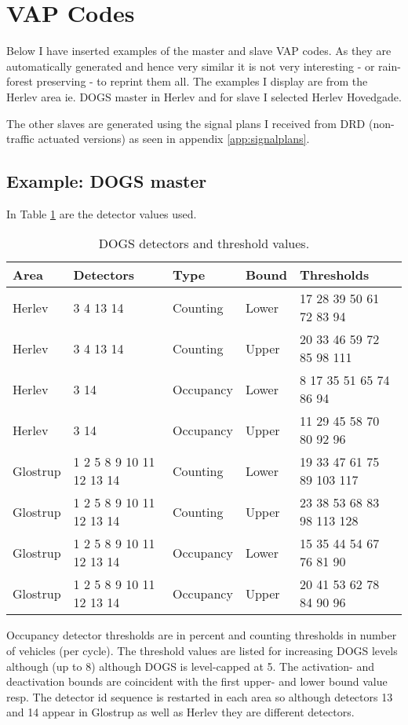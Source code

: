 \section{VAP Codes}
\label{app:vap}

Below I have inserted examples of the master and slave VAP codes. As they are automatically generated and hence very similar it is not very interesting - or rain-forest preserving - to reprint them all. The examples I display are from the Herlev area ie. DOGS master in Herlev and for slave I selected Herlev Hovedgade.

The other slaves are generated using the signal plans I received from DRD (non-traffic actuated versions) as seen in appendix \ref{app:signalplans}. 

\subsection{Example: DOGS master}
In Table \ref{tab:thvals} are the detector values used.

\begin{table}[ht]
\centering
\begin{tabular}{l|l|l|l|l}
\textbf{Area} & \textbf{Detectors} & \textbf{Type} & \textbf{Bound} & \textbf{Thresholds}\\ \hline
Herlev & 3 4 13 14 & Counting & Lower & 17 28 39 50 61 72 83 94\\
Herlev & 3 4 13 14 & Counting & Upper & 20 33 46 59 72 85 98 111\\
Herlev & 3 14 & Occupancy & Lower & 8 17 35 51 65 74 86 94\\
Herlev & 3 14 & Occupancy & Upper & 11 29 45 58 70 80 92 96\\
Glostrup & 1 2 5 8 9 10 11 12 13 14 & Counting & Lower & 19 33 47 61 75 89 103 117\\
Glostrup & 1 2 5 8 9 10 11 12 13 14 & Counting & Upper & 23 38 53 68 83 98 113 128\\
Glostrup & 1 2 5 8 9 10 11 12 13 14 & Occupancy & Lower & 15 35 44 54 67 76 81 90\\
Glostrup & 1 2 5 8 9 10 11 12 13 14 & Occupancy & Upper & 20 41 53 62 78 84 90 96\\
\end{tabular}
\caption{DOGS detectors and threshold values.}
\label{tab:thvals}
\end{table}

Occupancy detector thresholds are in percent and counting thresholds in number of vehicles (per cycle). The threshold values are listed for increasing DOGS levels although (up to 8) although DOGS is level-capped at 5. The activation- and deactivation bounds are coincident with the first upper- and lower bound value resp. The detector id sequence is restarted in each area so although detectors 13 and 14 appear in Glostrup as well as Herlev they are different detectors.

